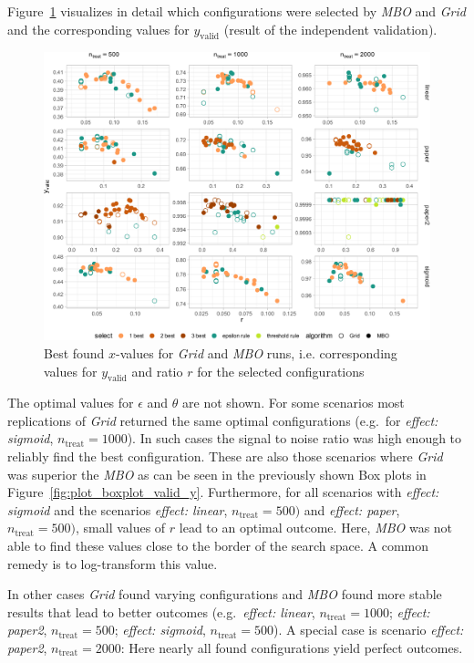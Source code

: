 \documentclass[bimj,fleqn]{w-art}
\theoremstyle{plain}
\theoremstyle{definition}
\begin{document}
Figure~\ref{fig:plot_best_x} visualizes in detail which configurations were selected by \emph{MBO} and \emph{Grid} and the corresponding values for $y_{\text{valid}}$ (result of the independent validation).
\begin{figure}[htb]
\centering
\includegraphics[width=\linewidth]{generated/figures/plot_best_x.pdf}
\caption{Best found $x$-values for \emph{Grid} and \emph{MBO} runs, i.e. corresponding values for $y_{\text{valid}}$ and ratio $r$ for the selected configurations}
\label{fig:plot_best_x}
\end{figure}
The optimal values for $\epsilon$ and $\theta$ are not shown.
For some scenarios most replications of \emph{Grid} returned the same optimal configurations (e.g.\ for \emph{effect: sigmoid}, $n_{\text{treat}} = 1000$).
In such cases the signal to noise ratio was high enough to reliably find the best configuration.
These are also those scenarios where \emph{Grid} was superior the \emph{MBO} as can be seen in the previously shown Box plots in Figure~\ref{fig:plot_boxplot_valid_y}.
Furthermore, for all scenarios with \emph{effect: sigmoid} and the scenarios \emph{effect: linear}, $n_{\text{treat}} = 500)$ and \emph{effect: paper}, $n_{\text{treat}} = 500)$, small values of $r$ lead to an optimal outcome.
Here, \emph{MBO} was not able to find these values close to the border of the search space.
A common remedy is to log-transform this value.

In other cases \emph{Grid} found varying configurations and \emph{MBO} found more stable results that lead to better outcomes (e.g.\ \emph{effect: linear}, $n_{\text{treat}} = 1000$; \emph{effect: paper2}, $n_{\text{treat}} = 500$; \emph{effect: sigmoid}, $n_{\text{treat}} = 500$).
A special case is scenario \emph{effect: paper2}, $n_{\text{treat}} = 2000$:
Here nearly all found configurations yield perfect outcomes.
\end{document}

